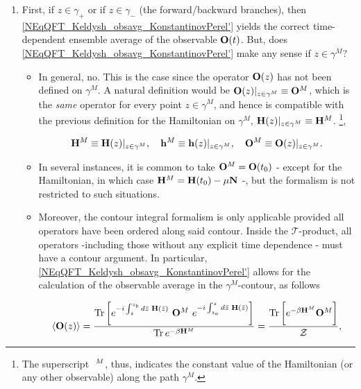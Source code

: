 \begin{enumerate}
    \item First, if $z \in \gamma_+$ or if $z \in \gamma_-$ (the forward/backward branches), then \cref{NEqQFT_Keldysh_obsavg_KonstantinovPerel'} yields the correct time-dependent ensemble average of the observable ${\bf O}(t)$. But, does \cref{NEqQFT_Keldysh_obsavg_KonstantinovPerel'} make any sense if $z \in \gamma^M$?
        \begin{itemize}
            \item In general, no. 
                    This is the case since the operator ${\bf O}(z)$ has not been defined on $\gamma^M$. 
                    A natural definition would be ${\bf O}(z)|_{z \in \gamma^M} \equiv {\bf O}^M$, which is the \emph{same} operator for every point $z \in \gamma^M$, and hence is compatible with the previous definition for the Hamiltonian on $\gamma^M$, ${\bf H}(z)|_{z \in \gamma^M} \equiv {\bf H}^M$.
                    \footnote{The superscript $\textnormal{ }^M$, thus, indicates the constant value of the Hamiltonian (or any other observable) along the path $\gamma^M$.}, 

                    \[
                        {\bf H}^M \equiv {\bf H}(z)|_{z \in \gamma^M}, \quad {\bf h}^M \equiv {\bf h}(z)|_{z \in \gamma^M}, \quad {\bf O}^M \equiv {\bf O}(z)|_{z \in \gamma^M}.
                    \]

            \item In several instances, it is common to take ${\bf O}^M = {\bf O}(t_0)$ - except for the Hamiltonian, in which case ${\bf H}^M = {\bf H}(t_0) - \mu {\bf N}$ -, but the formalism is not restricted to such situations.
        \item Moreover, the contour integral formalism is only applicable provided all operators have been ordered along said contour. 
        Inside the $\mathcal{T}$-product, all operators -including those without any explicit time dependence - must have a contour argument. 
        In particular, \cref{NEqQFT_Keldysh_obsavg_KonstantinovPerel'} allows for the calculation of the observable average in the $\gamma^M$-contour, as follows 

        \begin{equation}
            \langle {\bf O}(z) \rangle = \frac{\Tr \bigg[
                e^{-i \int_{z}^{z_b} d\bar{z} \textnormal{ } {\bf H}(\bar{z})} \textnormal{ } {\bf O}^M \textnormal{ } e^{-i \int_{z_a}^{z} d\bar{z} \textnormal{ } {\bf H}(\bar{z})}
            \bigg]}{\Tr e^{-\beta {\bf H}^M}} = \frac{\Tr \bigg[
                e^{-\beta {\bf H}^M} {\bf O}^M 
            \bigg]}{\mathcal{Z}},
        \end{equation}


\end{itemize}
\end{enumerate}
